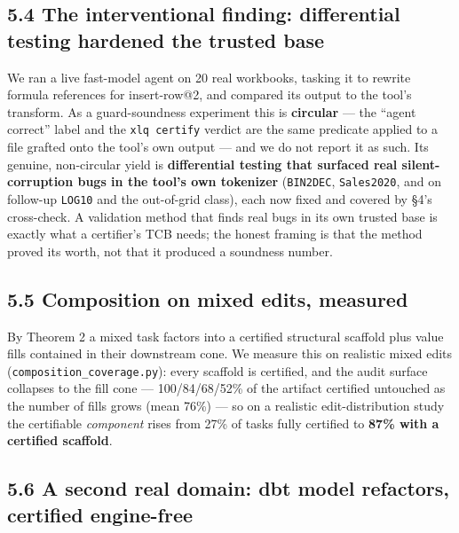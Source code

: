 \documentclass[
  11pt,
]{article}
\begin{document}
\subsection{5.4 The interventional finding: differential testing
hardened the trusted
base}\label{the-interventional-finding-differential-testing-hardened-the-trusted-base}

We ran a live fast-model agent on 20 real workbooks, tasking it to
rewrite formula references for insert-row@2, and compared its output to
the tool's transform. As a guard-soundness experiment this is
\textbf{circular} --- the ``agent correct'' label and the
\texttt{xlq\ certify} verdict are the same predicate applied to a file
grafted onto the tool's own output --- and we do not report it as such.
Its genuine, non-circular yield is \textbf{differential testing that
surfaced real silent-corruption bugs in the tool's own tokenizer}
(\texttt{BIN2DEC}, \texttt{Sales2020}, and on follow-up \texttt{LOG10}
and the out-of-grid class), each now fixed and covered by §4's
cross-check. A validation method that finds real bugs in its own trusted
base is exactly what a certifier's TCB needs; the honest framing is that
the method proved its worth, not that it produced a soundness number.

\subsection{5.5 Composition on mixed edits,
measured}\label{composition-on-mixed-edits-measured}

By Theorem 2 a mixed task factors into a certified structural scaffold
plus value fills contained in their downstream cone. We measure this on
realistic mixed edits (\texttt{composition\_coverage.py}): every
scaffold is certified, and the audit surface collapses to the fill cone
--- 100/84/68/52\% of the artifact certified untouched as the number of
fills grows (mean 76\%) --- so on a realistic edit-distribution study
the certifiable \emph{component} rises from 27\% of tasks fully
certified to \textbf{87\% with a certified scaffold}.

\subsection{5.6 A second real domain: dbt model refactors, certified
engine-free}\label{a-second-real-domain-dbt-model-refactors-certified-engine-free}
\end{document}
